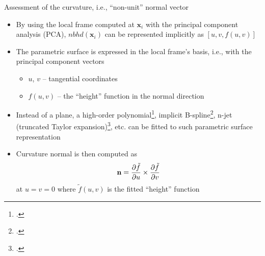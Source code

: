 \documentclass[xcolor=dvipsnames,10pt]{beamer}
\begin{document}
\begin{frame}{Assessment of the curvature, i.e., ``non-unit'' normal vector}
\begin{itemize}
    \item By using the local frame computed at $\mathbf{x}_i$ with the principal component analysis (PCA), $nbhd (\mathbf{x}_i)$ can be represented implicitly as $[ u, v, f(u, v) ]$
    \item The parametric surface is expressed in the local frame's basis, i.e., with the principal component vectors
    \begin{itemize}
        \item $u$, $v$ -- tangential coordinates
        \item $f(u, v)$ -- the ``height'' function in the normal direction
    \end{itemize}
    \item Instead of a plane, a high-order polynomial\footcite{Levin1998approximation}, implicit B-spline\footcite{Rouhani2015Implicit}, n-jet (truncated Taylor expansion)\footcite{Cazals2005Estimating}, etc. can be fitted to such parametric surface representation
    \item Curvature normal is then computed as
    \begin{equation*}
        \centering
        \mathbf{n} = \frac{\partial \tilde f}{\partial u} \times \frac{\partial \tilde f}{\partial v}
    \end{equation*}
    at $u = v = 0$ where $\tilde{f}(u, v)$ is the fitted ``height'' function
\end{itemize}
\end{frame}
\end{document}

